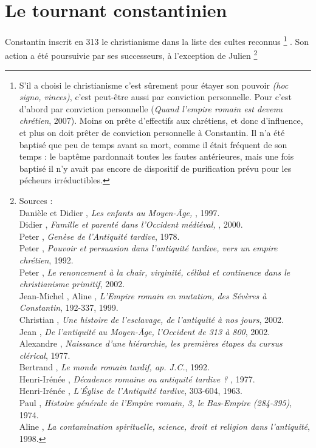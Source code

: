

\chapter{Le tournant constantinien}


 Constantin inscrit en 313 le christianisme dans la liste des cultes reconnus%
\footnote{S'il a choisi le christianisme c'est sûrement pour étayer son pouvoir \emph{(hoc signo, vinces)}, c'est peut-être aussi par conviction personnelle. Pour  c'est d'abord par conviction personnelle (\emph{Quand l'empire romain est devenu chrétien}, 2007). Moins on prête d'effectifs aux chrétiens, et donc d'influence, et plus on doit prêter de conviction personnelle à Constantin. Il n'a été baptisé que peu de temps avant sa mort, comme il était fréquent de son temps : le baptême pardonnait toutes les fautes antérieures, mais une fois baptisé il n'y avait pas encore de dispositif de purification prévu pour les pécheurs irréductibles. }%
. Son action a été poursuivie par ses successeurs, à l'exception de Julien%
\footnote{Sources :
\\Danièle  et Didier , \emph{Les enfants au Moyen-Âge, }, 1997.
\\Didier {}, \emph{Famille et parenté dans l'Occident médiéval, }, 2000.
\\Peter {}, \emph{Genèse de l'Antiquité tardive}, 1978.
\\Peter {}, \emph{Pouvoir et persuasion dans l'antiquité tardive, vers un empire chrétien}, 1992.
\\Peter {}, \emph{Le renoncement à la chair, virginité, célibat et continence dans le christianisme primitif}, 2002.
\\Jean-Michel , Aline , \emph{L'Empire romain en mutation, des Sévères à Constantin}, 192-337, 1999.
\\Christian {}, \emph{Une histoire de l'esclavage, de l'antiquité à nos jours}, 2002.
\\Jean {}, \emph{De l'antiquité au Moyen-Âge, l'Occident de 313 à 800}, 2002.
\\Alexandre {}, \emph{Naissance d'une hiérarchie, les premières étapes du cursus clérical}, 1977.
\\Bertrand {}, \emph{Le monde romain tardif,  ap. J.C.}, 1992.
\\Henri-Irénée , \emph{Décadence romaine ou antiquité tardive ? }, 1977.
\\Henri-Irénée , \emph{L'Église de l'Antiquité tardive}, 303-604, 1963.
\\Paul {}, \emph{Histoire générale de l'Empire romain, 3, le Bas-Empire (284-395)}, 1974.
\\Aline {}, \emph{La contamination spirituelle, science, droit et religion dans l'antiquité}, 1998.}%
